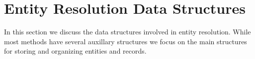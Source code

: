 
\section{Entity Resolution Data Structures}


In this section we discuss the data structures involved in entity resolution.
While most methods have several auxillary structures we focus on the main structures
for storing and organizing entities and records.





